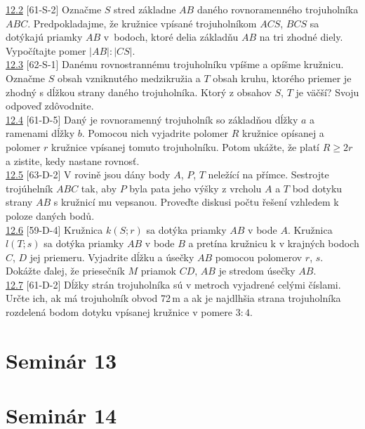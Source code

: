 \noindent \ul{12.2} [61-S-2] Označme $S$ stred základne $AB$ daného rovnoramenného trojuholníka $ABC$. Predpokladajme, že kružnice vpísané trojuholníkom $ACS$, $BCS$ sa dotýkajú priamky $AB$ v~bodoch, ktoré delia základňu $AB$ na tri zhodné diely. Vypočítajte pomer $|AB| : |CS|$.\\

\noindent \ul{12.3} [62-S-1] Danému rovnostrannému trojuholníku vpíšme a opíšme kružnicu. Označme $S$ obsah vzniknutého medzikružia a $T$ obsah kruhu, ktorého priemer je zhodný s dĺžkou strany daného trojuholníka. Ktorý z obsahov $S$, $T$ je väčší? Svoju odpoveď zdôvodnite.\\

\noindent \ul{12.4} [61-D-5] Daný je rovnoramenný trojuholník so základňou dĺžky $a$ a ramenami dĺžky $b$. Pomocou nich vyjadrite polomer $R$ kružnice opísanej a polomer $r$ kružnice vpísanej tomuto trojuholníku. Potom ukážte, že platí $R \geq 2r$ a zistite, kedy nastane rovnosť.\\

\noindent \ul{12.5} [63-D-2]  V rovině jsou dány body $A$, $P$, $T$ neležící na
přímce. Sestrojte trojúhelník $ABC$ tak, aby $P$ byla pata jeho výšky z vrcholu
$A$ a $T$ bod dotyku strany $AB$ s kružnicí mu vepsanou. Proveďte diskusi počtu
řešení vzhledem k poloze daných bodů.\\

\noindent \ul{12.6} [59-D-4] Kružnica $k(S; r)$ sa dotýka priamky $AB$ v bode $A$. Kružnica $l(T; s)$ sa dotýka priamky $AB$ v bode $B$ a pretína kružnicu k v krajných bodoch $C$, $D$ jej priemeru. Vyjadrite dĺžku a úsečky $AB$ pomocou polomerov $r$, $s$. Dokážte ďalej, že priesečník $M$ priamok $CD$, $AB$ je stredom úsečky $AB$.\\

\noindent \ul{12.7} [61-D-2] Dĺžky strán trojuholníka sú v metroch vyjadrené celými číslami. Určte ich, ak má trojuholník obvod 72\,m a ak je najdlhšia strana trojuholníka rozdelená bodom dotyku vpísanej kružnice v pomere $3 : 4.$\\

\section*{Seminár 13}

\section*{Seminár 14}

